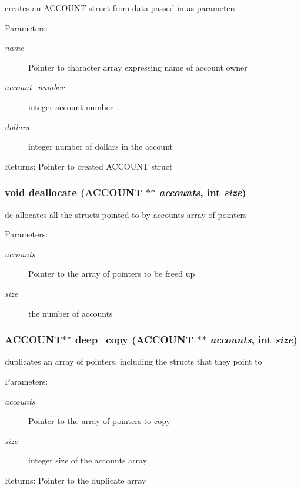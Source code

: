 creates an ACCOUNT struct from data passed in as parameters \begin{Desc}
\item[Parameters:]
\begin{description}
\item[{\em name}]Pointer to character array expressing name of account owner \item[{\em account\_\-number}]integer account number \item[{\em dollars}]integer number of dollars in the account \end{description}
\end{Desc}
\begin{Desc}
\item[Returns:]Pointer to created ACCOUNT struct \end{Desc}
\subsubsection{\setlength{\rightskip}{0pt plus 5cm}void deallocate (\bf{ACCOUNT} $\ast$$\ast$ {\em accounts}, int {\em size})}\label{account_8c_2a864bdb59fadc4b31f4683a7207b00b}


de-allocates all the structs pointed to by accounts array of pointers \begin{Desc}
\item[Parameters:]
\begin{description}
\item[{\em accounts}]Pointer to the array of pointers to be freed up \item[{\em size}]the number of accounts \end{description}
\end{Desc}
\subsubsection{\setlength{\rightskip}{0pt plus 5cm}\bf{ACCOUNT}$\ast$$\ast$ deep\_\-copy (\bf{ACCOUNT} $\ast$$\ast$ {\em accounts}, int {\em size})}\label{account_8c_f88930e0d4be0de9092530d35a1fbd26}


duplicates an array of pointers, including the structs that they point to \begin{Desc}
\item[Parameters:]
\begin{description}
\item[{\em accounts}]Pointer to the array of pointers to copy \item[{\em size}]integer size of the accounts array \end{description}
\end{Desc}
\begin{Desc}
\item[Returns:]Pointer to the duplicate array \end{Desc}

